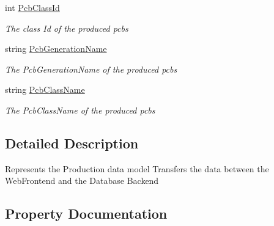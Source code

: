 \begin{DoxyCompactItemize}
int \hyperlink{classkpi_mvc_api_1_1_data_transfer_objects_1_1_production_data_dto_a5f3110f6e0132a9e86e0aac45f624a2b}{Pcb\+Class\+Id}
\begin{DoxyCompactList}\small\item\em The class Id of the produced pcbs \end{DoxyCompactList}\item 
string \hyperlink{classkpi_mvc_api_1_1_data_transfer_objects_1_1_production_data_dto_ad77f639a55366cc0afda98890fe6fe01}{Pcb\+Generation\+Name}
\begin{DoxyCompactList}\small\item\em The Pcb\+Generation\+Name of the produced pcbs \end{DoxyCompactList}\item 
string \hyperlink{classkpi_mvc_api_1_1_data_transfer_objects_1_1_production_data_dto_a127f9fd37bef01ad74c1360377f505dd}{Pcb\+Class\+Name}
\begin{DoxyCompactList}\small\item\em The Pcb\+Class\+Name of the produced pcbs \end{DoxyCompactList}\end{DoxyCompactItemize}


\subsection{Detailed Description}
Represents the Production data model Transfers the data between the Web\+Frontend and the Database Backend 



\subsection{Property Documentation}
\mbox{\label{classkpi_mvc_api_1_1_data_transfer_objects_1_1_production_data_dto_a5f3110f6e0132a9e86e0aac45f624a2b}} 
